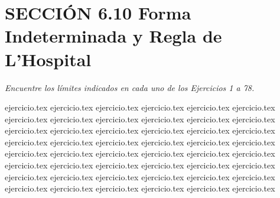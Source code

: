 
\section*{SECCIÓN 6.10 \quad Forma Indeterminada y Regla de L'Hospital}

\noindent \textit{Encuentre los límites indicados en cada uno de los Ejercicios 1 a 78.}

\begin{enumerate}
    \begin{minipage}{0.45\textwidth}
    {ejercicio.tex}
{ejercicio.tex}
{ejercicio.tex}
{ejercicio.tex}
{ejercicio.tex}
{ejercicio.tex}
{ejercicio.tex}
{ejercicio.tex}
{ejercicio.tex}
{ejercicio.tex}
{ejercicio.tex}
{ejercicio.tex}
{ejercicio.tex}
{ejercicio.tex}
{ejercicio.tex}
{ejercicio.tex}
{ejercicio.tex}
{ejercicio.tex}
{ejercicio.tex}
{ejercicio.tex}
{ejercicio.tex}
{ejercicio.tex}
{ejercicio.tex}
{ejercicio.tex}
{ejercicio.tex}
{ejercicio.tex}
{ejercicio.tex}
{ejercicio.tex}
{ejercicio.tex}
{ejercicio.tex}
{ejercicio.tex}
{ejercicio.tex}
{ejercicio.tex}
{ejercicio.tex}
{ejercicio.tex}
{ejercicio.tex}
{ejercicio.tex}
{ejercicio.tex}
{ejercicio.tex}
{ejercicio.tex}
{ejercicio.tex}
{ejercicio.tex}
{ejercicio.tex}
{ejercicio.tex}
{ejercicio.tex}
{ejercicio.tex}
{ejercicio.tex}
{ejercicio.tex}

\end{minipage}
\end{enumerate}
